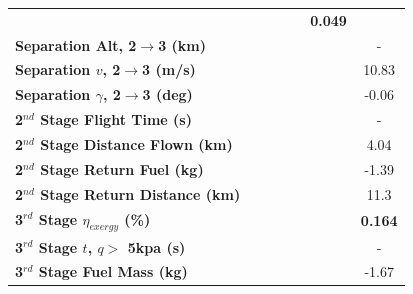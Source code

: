 \begin{table}[ht]
\begin{tabular}{l c c c c c c}
		& \textbf{\secondExergyEffIspNinetyFive}
		& \textbf{\secondExergyEffIspStandard}
		& \textbf{\secondExergyEffIspOneHundredFive}
		& \textbf{\secondExergyEffIspOneHundredTen}
		& \textbf{0.049}
		\\
		\textbf{Separation Alt, 2$\rightarrow$3 (km)}
		& \secondthirdSeparationAltIspNinety
		& \secondthirdSeparationAltIspNinetyFive
		& \secondthirdSeparationAltIspStandard
		& \secondthirdSeparationAltIspOneHundredFive
		& \secondthirdSeparationAltIspOneHundredTen
		& -
		\\
		\textbf{Separation $v$, 2$\rightarrow$3 (m/s)}
		& \secondthirdSeparationvIspNinety
		& \secondthirdSeparationvIspNinetyFive
		& \secondthirdSeparationvIspStandard
		& \secondthirdSeparationvIspOneHundredFive
		& \secondthirdSeparationvIspOneHundredTen
		&10.83
		\\
		\textbf{Separation $\gamma$, 2$\rightarrow$3 (deg)}
		& \secondthirdSeparationgammaIspNinety
		& \secondthirdSeparationgammaIspNinetyFive
		& \secondthirdSeparationgammaIspStandard
		& \secondthirdSeparationgammaIspOneHundredFive
		& \secondthirdSeparationgammaIspOneHundredTen
		&-0.06
		\\
		\textbf{2$^{nd}$ Stage Flight Time (s)}
		& \secondFlightTimeIspNinety
		& \secondFlightTimeIspNinetyFive
		& \secondFlightTimeIspStandard
		& \secondFlightTimeIspOneHundredFive
		& \secondFlightTimeIspOneHundredTen
		& -
		\\
		\textbf{2$^{nd}$ Stage Distance Flown (km)}
		& \SecondDistIspNinety
		& \SecondDistIspNinetyFive
		& \SecondDistIspStandard
		& \SecondDistIspOneHundredFive
		& \SecondDistIspOneHundredTen
		&4.04
		\\
		\textbf{2$^{nd}$ Stage Return Fuel (kg)}
		& \returnFuelIspNinety
		& \returnFuelIspNinetyFive
		& \returnFuelIspStandard
		& \returnFuelIspOneHundredFive
		& \returnFuelIspOneHundredTen
		&-1.39
		\\
		\textbf{2$^{nd}$ Stage Return Distance (km)}
		& \returnDistIspNinety
		& \returnDistIspNinetyFive
		& \returnDistIspStandard
		& \returnDistIspOneHundredFive
		& \returnDistIspOneHundredTen
		&11.3
		\\
		\hline 
		\textbf{3$^{rd}$ Stage $\eta_{exergy}$ (\%)}
		& \textbf{\thirddExergyEffIspNinety}
		& \textbf{\thirddExergyEffIspNinetyFive}
		& \textbf{\thirddExergyEffIspStandard}
		& \textbf{\thirddExergyEffIspOneHundredFive}
		& \textbf{\thirddExergyEffIspOneHundredTen}
		& \textbf{0.164}
		\\
		\textbf{3$^{rd}$ Stage $t$, $q >$ 5kpa (s)}
		& \thirdqOverFiveIspNinety
		& \thirdqOverFiveIspNinetyFive
		& \thirdqOverFiveIspStandard
		& \thirdqOverFiveIspOneHundredFive
		& \thirdqOverFiveIspOneHundredTen
		& -
		\\
		\textbf{3$^{rd}$ Stage Fuel Mass (kg)}
		& \thirdmFuelIspNinety
		& \thirdmFuelIspNinetyFive
		& \thirdmFuelIspStandard
		& \thirdmFuelIspOneHundredFive
		& \thirdmFuelIspOneHundredTen
		&-1.67
		\\
		\hline 
	\end{tabular} 
	

\end{table}
